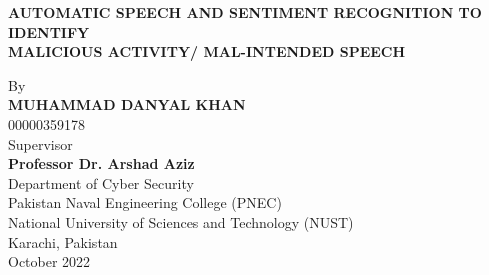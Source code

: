 
    \newpage
    \begin{titlepage}
        \centering
        \vspace {1cm}
        \huge{\textbf{AUTOMATIC SPEECH AND SENTIMENT RECOGNITION TO IDENTIFY \\       	      
        MALICIOUS ACTIVITY/ MAL-INTENDED SPEECH}} \\ [0.25cm]
        \begin{figure}[ht!]
            \centering
            \def\svgwidth{0.25\columnwidth}
            
        \end{figure}
        \vspace {0.5cm}
        \Large{By} \\
        \Large{\textbf{MUHAMMAD DANYAL KHAN}} \\
        \Large{00000359178} \\[0.75cm]
        \Large{Supervisor} \\
        \Large{\textbf{Professor Dr. Arshad Aziz}} \\[0.75cm]
        \Large{Department of Cyber Security \\
        Pakistan Naval Engineering College (PNEC) \\ 
        National University of Sciences and Technology (NUST) \\
        Karachi, Pakistan} \\ [0.75 cm]
        \Large{October 2022}
    \end{titlepage}

